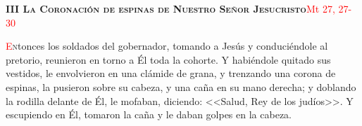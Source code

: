 \noindent\textbf{\textsc{III La Coronación de espinas de Nuestro Señor Jesucristo}}\hfill\textcolor{red}{Mt 27, 27-30}

\vspace{0.25em}

\lettrine[lines=2]{\textcolor{red}{E}}ntonces los soldados del gobernador, tomando a Jesús y conduciéndole al pretorio, reunieron en torno a Él toda la cohorte. 
Y habiéndole quitado sus vestidos, le envolvieron en una clámide de grana, y trenzando una corona de espinas, la pusieron sobre su cabeza, 
y una caña en su mano derecha; y doblando la rodilla delante de Él, le mofaban, diciendo: <<Salud, Rey de los judíos>>. Y escupiendo en Él, 
tomaron la caña y le daban golpes en la cabeza.